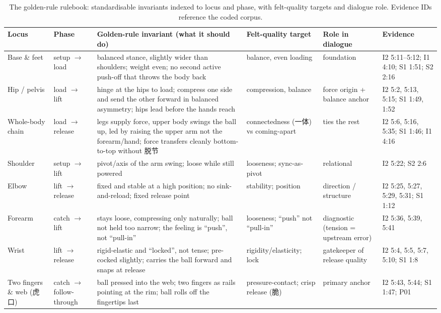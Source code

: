 \documentclass[sigconf]{acmart}
\begin{document}
\begin{table}[t]
\centering
\scriptsize
\caption{The golden-rule rulebook: standardisable invariants indexed to locus and phase, with felt-quality targets and dialogue role. Evidence IDs reference the coded corpus.}
\label{tab:rulebook}
\begin{tabular}{@{}p{1.6cm}p{1.7cm}p{5.2cm}p{2.6cm}p{2.4cm}p{2.2cm}@{}}
\toprule
Locus & Phase & Golden-rule invariant (what it should do) & Felt-quality target & Role in dialogue & Evidence \\
\midrule
Base \& feet & setup $\rightarrow$ load & balanced stance, slightly wider than shoulders; weight even; no second active push-off that throws the body back & balance, even loading & foundation & I2 5:11--5:12; I1 4:10; S1 1:51; S2 2:16 \\
Hip / pelvis & load $\rightarrow$ lift & hinge at the hips to load; compress one side and send the other forward in balanced asymmetry; hips lead before the hands reach & compression, balance & force origin + balance anchor & I2 5:2, 5:13, 5:15; S1 1:49, 1:52 \\
Whole-body chain & load $\rightarrow$ release & legs supply force, upper body swings the ball up, led by raising the upper arm not the forearm/hand; force transfers cleanly bottom-to-top without 脱节 & connectedness (一体) vs coming-apart & ties the rest & I2 5:6, 5:16, 5:35; S1 1:46; I1 4:16 \\
Shoulder & setup $\rightarrow$ lift & pivot/axis of the arm swing; loose while still powered & looseness; sync-as-pivot & relational & I2 5:22; S2 2:6 \\
Elbow & lift $\rightarrow$ release & fixed and stable at a high position; no sink-and-reload; fixed release point & stability; position & direction / structure & I2 5:25, 5:27, 5:29, 5:31; S1 1:12 \\
Forearm & catch $\rightarrow$ lift & stays loose, compressing only naturally; ball not held too narrow; the feeling is ``push'', not ``pull-in'' & looseness; ``push'' not ``pull-in'' & diagnostic (tension = upstream error) & I2 5:36, 5:39, 5:41 \\
Wrist & lift $\rightarrow$ release & rigid-elastic and ``locked'', not tense; pre-cocked slightly; carries the ball forward and snaps at release & rigidity/elasticity; lock & gatekeeper of release quality & I2 5:4, 5:5, 5:7, 5:10; S1 1:8 \\
Two fingers \& web (虎口) & catch $\rightarrow$ follow-through & ball pressed into the web; two fingers as rails pointing at the rim; ball rolls off the fingertips last & pressure-contact; crisp release (脆) & primary anchor & I2 5:43, 5:44; S1 1:47; P01 \\

\end{tabular}
\end{table}
\end{document}
